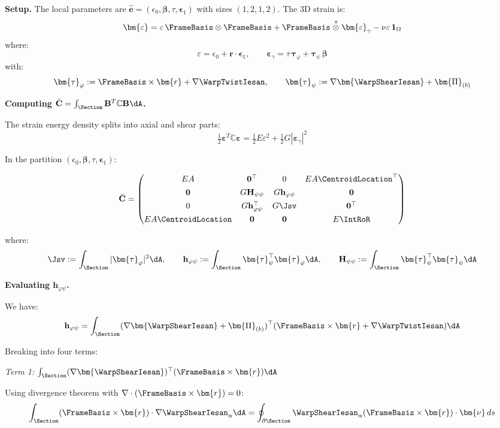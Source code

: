 
\textbf{Setup.} The local parameters are
\(\hat{\bm{e}} = (\epsilon_0, \bm{\beta}, \tau, \bm{\epsilon}_1)\) with
sizes \((1, 2, 1, 2)\). The 3D strain is:
\[\bm{\varepsilon} = \varepsilon\,\FrameBasis \otimes \FrameBasis + \FrameBasis \stackrel{s}{\otimes} \bm{\varepsilon}_\gamma - \nu\varepsilon\,\mathbf{1}_\Omega\]
where:
\[\varepsilon = \epsilon_0 + \bm{r} \cdot \bm{\epsilon}_1, \qquad \bm{\varepsilon}_\gamma = \tau\,\bm{\tau}_\varphi + \bm{\tau}_\psi\,\bm{\beta}\]
with:
\[\bm{\tau}_\varphi := \FrameBasis \times \bm{r} + \nabla\WarpTwistIesan, \qquad \bm{\tau}_\psi := \nabla\bm{\WarpShearIesan} + \bm{\Pi}_{(b)}\]

\textbf{Computing
\(\bar{\mathbf{C}} = \int_\Section \mathbf{B}^T \mathbb{C} \mathbf{B} \dA\).}

The strain energy density splits into axial and shear parts:
\[\tfrac{1}{2}\bm{\varepsilon}^T \mathbb{C} \bm{\varepsilon} = \tfrac{1}{2}E\varepsilon^2 + \tfrac{1}{2}G|\bm{\varepsilon}_\gamma|^2\]

In the partition \((\epsilon_0, \bm{\beta}, \tau, \bm{\epsilon}_1)\):

\[\bar{\mathbf{C}} = \begin{pmatrix}
EA & \mathbf{0}^\top & 0 & EA\CentroidLocation^\top \\[4pt]
\mathbf{0} & G\mathbf{H}_{\psi\psi} & G\mathbf{h}_{\varphi\psi} & \mathbf{0} \\[4pt]
0 & G\mathbf{h}_{\varphi\psi}^\top & G\Jsv & \mathbf{0}^\top \\[4pt]
EA\CentroidLocation & \mathbf{0} & \mathbf{0} & E\IntRoR
\end{pmatrix}\]

where:
\[\Jsv := \int_\Section |\bm{\tau}_\varphi|^2 \dA, \qquad \mathbf{h}_{\varphi\psi} := \int_\Section \bm{\tau}_\psi^\top \bm{\tau}_\varphi \dA, \qquad \mathbf{H}_{\psi\psi} := \int_\Section \bm{\tau}_\psi^\top \bm{\tau}_\psi \dA\]

\textbf{Evaluating \(\mathbf{h}_{\varphi\psi}\).}

We have:
\[\mathbf{h}_{\varphi\psi} = \int_\Section (\nabla\bm{\WarpShearIesan} + \bm{\Pi}_{(b)})^\top (\FrameBasis \times \bm{r} + \nabla\WarpTwistIesan) \dA\]

Breaking into four terms:

\emph{Term 1:}
\(\int_\Section (\nabla\bm{\WarpShearIesan})^\top (\FrameBasis \times \bm{r}) \dA\)

Using divergence theorem with
\(\nabla \cdot (\FrameBasis \times \bm{r}) = 0\):
\[\int_\Section (\FrameBasis \times \bm{r}) \cdot \nabla\WarpShearIesan_\alpha \dA = \oint_{\partial\Section} \WarpShearIesan_\alpha (\FrameBasis \times \bm{r}) \cdot \bm{\nu} \, ds\]

